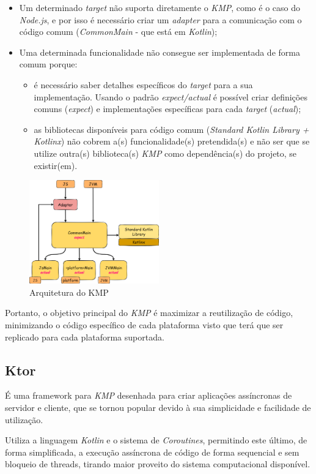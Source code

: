 \begin{itemize}[topsep=0pt,itemsep=0pt,partopsep=0pt, parsep=0pt]
    \item Um determinado \textit{target} não suporta diretamente o \textit{KMP}, como é o caso do \textit{Node.js}, e por isso é necessário criar um \textit{adapter} para a comunicação com o código comum (\textit{CommonMain} - que está em \textit{Kotlin});
    \item Uma determinada funcionalidade não consegue ser implementada de forma comum porque:
    \begin{itemize}[topsep=0pt,itemsep=0pt,partopsep=0pt, parsep=0pt]
        \item é necessário saber detalhes específicos do \textit{target} para a sua implementação.
        Usando o padrão \textit{expect/actual} é possível criar definições comuns (\textit{expect}) e implementações específicas para cada \textit{target} (\textit{actual});
        \item as bibliotecas disponíveis para código comum (\textit{Standard Kotlin Library + Kotlinx}) não cobrem a(s) funcionalidade(s) pretendida(s) e não ser que se utilize outra(s) biblioteca(s) \textit{KMP} como dependência(s) do projeto, se existir(em).
    \end{itemize}
\end{itemize}

\begin{figure}[H]
    \centering
    \includegraphics[width=0.5\textwidth]{../docs/imgs/kmp-architecture}
    \caption{Arquitetura do KMP}
    \label{fig:kmp-architecture}
\end{figure}

Portanto, o objetivo principal do \textit{KMP} é maximizar a reutilização de código, minimizando o código específico de cada plataforma visto que terá que ser replicado para cada plataforma suportada.

\subsection{Ktor}\label{subsec:ktor}

É uma framework para \textit{KMP} desenhada para criar aplicações assíncronas de
servidor e cliente, que se tornou popular devido à sua simplicidade e facilidade de utilização.

Utiliza a linguagem \textit{Kotlin} e o sistema de \textit{Coroutines}, permitindo este último, de forma simplificada, a execução
assíncrona de código de forma sequencial e sem bloqueio de threads, tirando maior proveito do sistema computacional disponível.